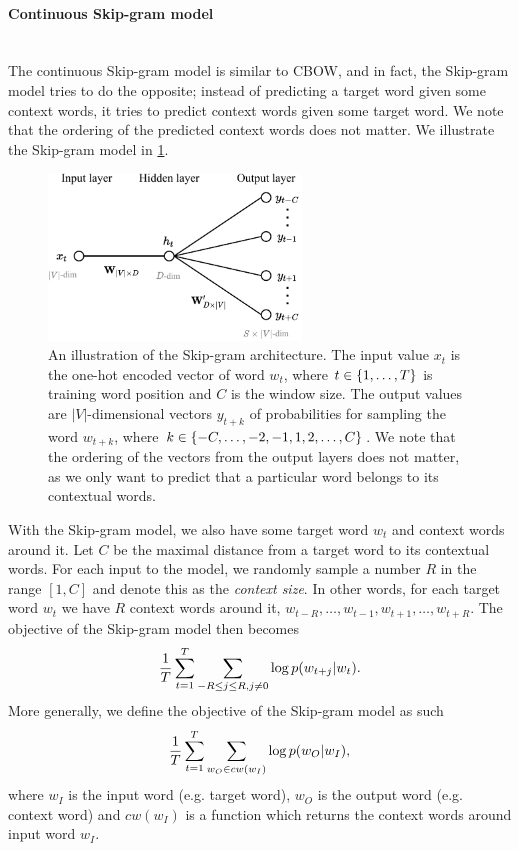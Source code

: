 \paragraph*{Continuous Skip-gram model}\mbox{} \\
The continuous Skip-gram model is similar to CBOW, and in fact, the Skip-gram model tries to do the opposite; instead of predicting a target word given some context words, it tries to predict context words given some target word. We note that the ordering of the predicted context words does not matter. We illustrate the Skip-gram model in \cref{fig:skip-gram-model}.
\begin{figure}[H]
    \centering
    \includegraphics[width=0.6\textwidth]{thesis/figures/skim-gram_cropped.pdf}
    \caption{An illustration of the Skip-gram architecture. The input value $x_t$ is the one-hot encoded vector of word $w_t$, where $t \in \left\{1, \ldots, T\right\}$ is training word position and $C$ is the window size. The output values are $|V|$-dimensional vectors $y_{t+k}$ of probabilities for sampling the word $w_{t+k}$, where $k \in \left\{-C, \ldots, -2, -1, 1, 2, \ldots, C\right\}$. We note that the ordering of the vectors from the output layers does not matter, as we only want to predict that a particular word belongs to its contextual words.}
    \label{fig:skip-gram-model}
\end{figure}

With the Skip-gram model, we also have some target word $w_t$ and context words around it. Let $C$ be the maximal distance from a target word to its contextual words. For each input to the model, we randomly sample a number $R$ in the range $[1, C]$ and denote this as the \textit{context size}. In other words, for each target word $w_t$ we have $R$ context words around it, $w_{t-R}, \ldots, w_{t-1}, w_{t+1}, \ldots, w_{t+R}$. The objective of the Skip-gram model then becomes
\begin{align}
    \frac{1}{T} \sum\limits_{t=1}^{T} \sum\limits_{-R \leq j \leq R, j \neq 0}^{} \log p(w_{t+j} | w_t).
    \label{eqn:skip-gram-objective-function}
\end{align}
More generally, we define the objective of the Skip-gram model as such
\begin{align}
    \frac{1}{T} \sum\limits_{t=1}^{T} \sum\limits_{w_O \in cw(w_I)}^{} \log p(w_O | w_I),
    \label{eqn:skip-gram-objective-function-general}
\end{align}
where $w_I$ is the input word (e.g. target word), $w_O$ is the output word (e.g. context word) and $cw(w_I)$ is a function which returns the context words around input word $w_I$.

